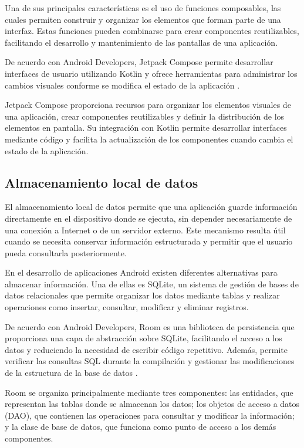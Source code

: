 \documentclass[12pt,a4paper]{article}
\begin{document}
Una de sus principales características es el uso de
funciones composables, las cuales permiten construir y
organizar los elementos que forman parte de una interfaz.
Estas funciones pueden combinarse para crear componentes
reutilizables, facilitando el desarrollo y mantenimiento
de las pantallas de una aplicación.

De acuerdo con Android Developers, Jetpack Compose
permite desarrollar interfaces de usuario utilizando
Kotlin y ofrece herramientas para administrar los cambios
visuales conforme se modifica el estado de la aplicación
\textcite{androidComposeDocs}.

Jetpack Compose proporciona recursos para organizar
los elementos visuales de una aplicación, crear
componentes reutilizables y definir la distribución de
los elementos en pantalla. Su integración con Kotlin
permite desarrollar interfaces mediante código y
facilita la actualización de los componentes cuando
cambia el estado de la aplicación.



\subsection{Almacenamiento local de datos}

El almacenamiento local de datos permite que una aplicación guarde información directamente en el dispositivo donde se ejecuta, sin depender necesariamente de una conexión a Internet o de un servidor externo. Este mecanismo resulta útil cuando se necesita conservar información estructurada y permitir que el usuario pueda consultarla posteriormente.

En el desarrollo de aplicaciones Android existen diferentes alternativas para almacenar información. Una de ellas es SQLite, un sistema de gestión de bases de datos relacionales que permite organizar los datos mediante tablas y realizar operaciones como insertar, consultar, modificar y eliminar registros.

De acuerdo con Android Developers, Room es una biblioteca de persistencia que proporciona una capa de abstracción sobre SQLite, facilitando el acceso a los datos y reduciendo la necesidad de escribir código repetitivo. Además, permite verificar las consultas SQL durante la compilación y gestionar las modificaciones de la estructura de la base de datos \parencite{androidRoom}.

Room se organiza principalmente mediante tres componentes: las entidades, que representan las tablas donde se almacenan los datos; los objetos de acceso a datos (DAO), que contienen las operaciones para consultar y modificar la información; y la clase de base de datos, que funciona como punto de acceso a los demás componentes.
\end{document}
